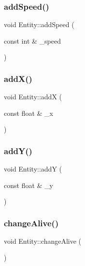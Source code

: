\mbox{\label{class_entity_ae719bdd116440d6791f609c8d4037462}} 
\subsubsection{\texorpdfstring{add\+Speed()}{addSpeed()}}
{\footnotesize\ttfamily void Entity\+::add\+Speed (\begin{DoxyParamCaption}\item[{const int \&}]{\+\_\+speed }\end{DoxyParamCaption})\hspace{0.3cm}{\ttfamily [inline]}}

\mbox{\label{class_entity_a59d99a7f50548a97b5dbd6fa4c86cf74}} 
\subsubsection{\texorpdfstring{add\+X()}{addX()}}
{\footnotesize\ttfamily void Entity\+::addX (\begin{DoxyParamCaption}\item[{const float \&}]{\+\_\+x }\end{DoxyParamCaption})}

\mbox{\label{class_entity_a38b1024628b023e95781ca94917acfef}} 
\subsubsection{\texorpdfstring{add\+Y()}{addY()}}
{\footnotesize\ttfamily void Entity\+::addY (\begin{DoxyParamCaption}\item[{const float \&}]{\+\_\+y }\end{DoxyParamCaption})}

\mbox{\label{class_entity_a6f03954ccfcbe4835286543d19c7fae3}} 
\subsubsection{\texorpdfstring{change\+Alive()}{changeAlive()}}
{\footnotesize\ttfamily void Entity\+::change\+Alive (\begin{DoxyParamCaption}{ }\end{DoxyParamCaption})\hspace{0.3cm}{\ttfamily [inline]}}

